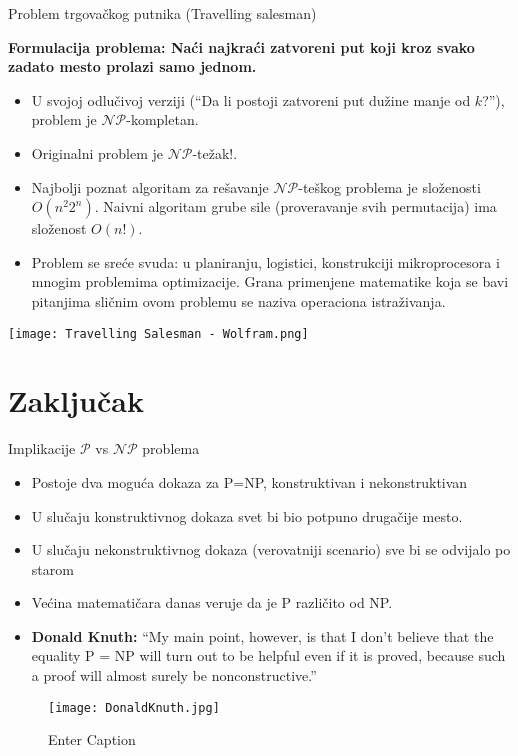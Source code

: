 \documentclass[aspectratio=169, xcolor=table, 10pt]{beamer}
\theoremstyle{definition}
\begin{document}
\begin{frame}{Problem trgova\v ckog putnika (Travelling salesman)}


\noindent\begin{minipage}{0.6\textwidth}
    \leftflush
    \textbf{Formulacija problema: Na\' ci najkra\' ci zatvoreni put koji kroz svako zadato mesto prolazi samo jednom.}
    \begin{itemize}
        \item U svojoj odlu\v civoj verziji (“Da li postoji zatvoreni put du\v zine manje od $k$?”), problem je $\mathcal{NP}$-kompletan.
        \item Originalni problem je  $\mathcal{NP}$-te\v zak!.
        \item Najbolji poznat algoritam za re\v savanje $\mathcal{NP}$-te\v skog problema je slo\v zenosti $O(n^2 2^n)$. Naivni algoritam grube sile (proveravanje svih permutacija) ima slo\v zenost $O(n!)$. 
        \item Problem se sre\' ce svuda: u planiranju, logistici, konstrukciji mikroprocesora i mnogim problemima optimizacije. Grana primenjene matematike koja se bavi pitanjima sli\v cnim ovom problemu se naziva operaciona istra\v zivanja.
    \end{itemize}
\end{minipage}%
\hfill
\begin{minipage}{0.38\textwidth}
    \raggedleft
    \texttt{[image: Travelling Salesman - Wolfram.png]}
\end{minipage}

\end{frame}

\section{Zaklju\v cak}

\begin{frame}{Implikacije $\mathcal{P}$ vs $\mathcal{NP}$ problema}

\begin{itemize}
\item Postoje dva moguća dokaza za P=NP, konstruktivan i nekonstruktivan
\item U slučaju konstruktivnog dokaza svet bi bio potpuno drugačije mesto.
\item U slučaju nekonstruktivnog dokaza (verovatniji scenario) sve bi se odvijalo po starom
\item Većina matematičara danas veruje da je P različito od NP.
\item \textbf{Donald Knuth:} “My main point, however, is that I don't believe that the equality P = NP will turn out to be helpful even if it is proved, because such a proof will almost surely be nonconstructive.”
\end{itemize}

\begin{figure}
    \centering
    \texttt{[image: DonaldKnuth.jpg]}
    \caption{Enter Caption}
\end{figure}

\end{frame}
\end{document}
